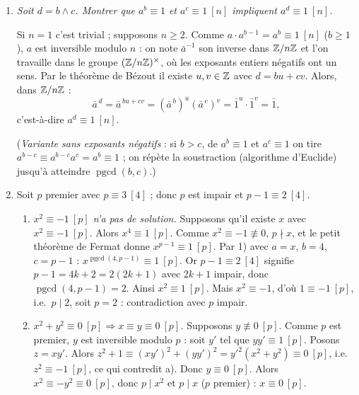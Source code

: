 \documentclass[11pt,a4paper]{article}
\newcommand{\pgcd}{\operatorname{pgcd}}
\begin{document}
	\begin{corrige}
		\begin{enumerate}
			\item \emph{Soit $d=b\wedge c$. Montrer que $a^b\equiv1$ et $a^c\equiv1\ [n]$ impliquent $a^d\equiv1\ [n]$.}
			
			Si $n=1$ c'est trivial ; supposons $n\geq2$. Comme $a\cdot a^{b-1}=a^b\equiv1\ [n]$ ($b\geq1$), $a$ est inversible modulo $n$ : on note $\bar a^{-1}$ son inverse dans $\mathbb{Z}/n\mathbb{Z}$ et l'on travaille dans le groupe $(\mathbb{Z}/n\mathbb{Z})^\times$, où les exposants entiers négatifs ont un sens. Par le théorème de Bézout il existe $u,v\in\mathbb{Z}$ avec $d=bu+cv$. Alors, dans $\mathbb{Z}/n\mathbb{Z}$ :
			$$\bar a^{\,d}=\bar a^{\,bu+cv}=(\bar a^{\,b})^u(\bar a^{\,c})^v=\bar1^u\cdot\bar1^v=\bar1,$$
			c'est-à-dire $a^d\equiv1\ [n]$.
			
			(\emph{Variante sans exposants négatifs} : si $b>c$, de $a^b\equiv1$ et $a^c\equiv1$ on tire $a^{b-c}\equiv a^{b-c}a^c=a^b\equiv1$ ; on répète la soustraction (algorithme d'Euclide) jusqu'à atteindre $\pgcd(b,c)$.)
			\item Soit $p$ premier avec $p\equiv3\ [4]$ ; donc $p$ est impair et $p-1\equiv2\ [4]$.
			\begin{enumerate}
				\item \emph{$x^2\equiv-1\ [p]$ n'a pas de solution.} Supposons qu'il existe $x$ avec $x^2\equiv-1\ [p]$. Alors $x^4\equiv1\ [p]$. Comme $x^2\equiv-1\not\equiv0$, $p\nmid x$, et le petit théorème de Fermat donne $x^{p-1}\equiv1\ [p]$. Par 1) avec $a=x$, $b=4$, $c=p-1$ : $x^{\pgcd(4,p-1)}\equiv1\ [p]$. Or $p-1\equiv2\ [4]$ signifie $p-1=4k+2=2(2k+1)$ avec $2k+1$ impair, donc $\pgcd(4,p-1)=2$. Ainsi $x^2\equiv1\ [p]$. Mais $x^2\equiv-1$, d'où $1\equiv-1\ [p]$, i.e.\ $p\mid2$, soit $p=2$ : contradiction avec $p$ impair.
				\item \emph{$x^2+y^2\equiv0\ [p]\Rightarrow x\equiv y\equiv0\ [p]$.} Supposons $y\not\equiv0\ [p]$. Comme $p$ est premier, $y$ est inversible modulo $p$ : soit $y'$ tel que $yy'\equiv1\ [p]$. Posons $z=xy'$. Alors $z^2+1\equiv(xy')^2+(yy')^2=y'^2(x^2+y^2)\equiv0\ [p]$, i.e.\ $z^2\equiv-1\ [p]$, ce qui contredit a). Donc $y\equiv0\ [p]$. Alors $x^2\equiv-y^2\equiv0\ [p]$, donc $p\mid x^2$ et $p\mid x$ ($p$ premier) : $x\equiv0\ [p]$.
			\end{enumerate}
		\end{enumerate}
	\end{corrige}
	
\end{document}
